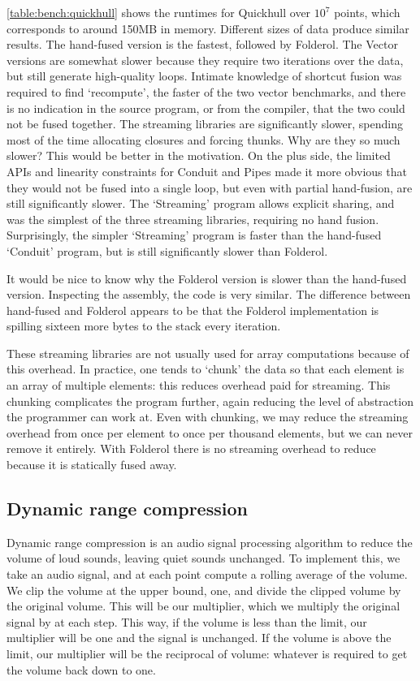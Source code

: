 \autoref{table:bench:quickhull} shows the runtimes for Quickhull over $10^7$ points, which corresponds to around 150MB in memory.
Different sizes of data produce similar results.
The hand-fused version is the fastest, followed by Folderol.
The Vector versions are somewhat slower because they require two iterations over the data, but still generate high-quality loops.
Intimate knowledge of shortcut fusion was required to find `recompute', the faster of the two vector benchmarks, and there is no indication in the source program, or from the compiler, that the two could not be fused together.
The streaming libraries are significantly slower, spending most of the time allocating closures and forcing thunks.
Why are they so much slower? This would be better in the motivation.
On the plus side, the limited APIs and linearity constraints for Conduit and Pipes made it more obvious that they would not be fused into a single loop, but even with partial hand-fusion, are still significantly slower.
The `Streaming' program allows explicit sharing, and was the simplest of the three streaming libraries, requiring no hand fusion.
Surprisingly, the simpler `Streaming' program is faster than the hand-fused `Conduit' program, but is still significantly slower than Folderol.

It would be nice to know why the Folderol version is slower than the hand-fused version.
Inspecting the assembly, the code is very similar.
The difference between hand-fused and Folderol appears to be that the Folderol implementation is spilling sixteen more bytes to the stack every iteration.

These streaming libraries are not usually used for array computations because of this overhead.
In practice, one tends to `chunk' the data so that each element is an array of multiple elements: this reduces overhead paid for streaming.
This chunking complicates the program further, again reducing the level of abstraction the programmer can work at.
Even with chunking, we may reduce the streaming overhead from once per element to once per thousand elements, but we can never remove it entirely.
With Folderol there is no streaming overhead to reduce because it is statically fused away.

\subsection{Dynamic range compression}
Dynamic range compression is an audio signal processing algorithm to reduce the volume of loud sounds, leaving quiet sounds unchanged.
To implement this, we take an audio signal, and at each point compute a rolling average of the volume.
We clip the volume at the upper bound, one, and divide the clipped volume by the original volume.
This will be our multiplier, which we multiply the original signal by at each step.
This way, if the volume is less than the limit, our multiplier will be one and the signal is unchanged. 
If the volume is above the limit, our multiplier will be the reciprocal of volume: whatever is required to get the volume back down to one.

